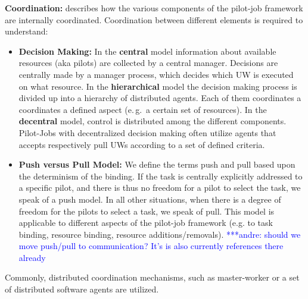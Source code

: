 \documentclass[conference,final]{IEEEtran}
\newcommand{\alnote}[1]{ {\textcolor{blue} { ***andre: #1 }}}
\newcommand{\alnote}[1]{}
\begin{document}
\textbf{Coordination:} describes how the various components of the
pilot-job framework are internally coordinated. Coordination between
different elements is required to understand:

\begin{itemize}
\item \textbf{Decision Making:} In the \textbf{central} model
  information about available resources (aka pilots) are collected by
  a central manager.  Decisions are centrally made by a manager
  process, which decides which UW is executed on what resource. In the
  \textbf{hierarchical} model the decision making process is divided
  up into a hierarchy of distributed agents. Each of them coordinates
  a coordinates a defined aspect (e.\,g.\ a certain set of
  resources). In the \textbf{decentral} model, control is distributed
  among the different components. Pilot-Jobs with decentralized
  decision making often utilize agents that accepts respectively pull
  UWs according to a set of defined criteria.

\item \textbf{Push versus Pull Model:} We define the terms push and
  pull based upon the determinism of the binding. If the task is
  centrally explicitly addressed to a specific pilot, and there is
  thus no freedom for a pilot to select the task, we speak of a push
  model. In all other situations, when there is a degree of freedom
  for the pilots to select a task, we speak of pull. This model is
  applicable to different aspects of the pilot-job framework (e.g. to
  task binding, resource binding, resource additions/removals).
  \alnote{should we move push/pull to communication? It's is also
    currently references there already}

\end{itemize}

Commonly, distributed coordination mechanisms, such as master-worker
or a set of distributed software agents are utilized.

\end{document}
